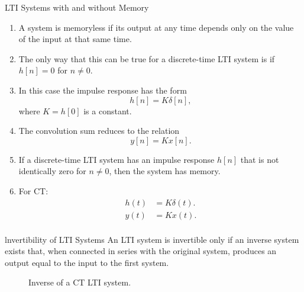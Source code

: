 \begin{frame}{LTI Systems with and without Memory}
    \begin{enumerate}
        \item A system is memoryless if its output at any time depends only on the value of the input at that same time.
        \item The only way that this can be true for a discrete-time LTI system is if $h[n] = 0$ for $n \neq 0$.
        \item In this case the impulse response has the form
        \begin{equation*}
            h[n] = K\delta[n],
        \end{equation*}
        where $K = h[0]$ is a constant.
        \item The convolution sum reduces to the relation
        \begin{equation*}
            y[n] = Kx[n].
        \end{equation*}
        \item If a discrete-time LTI system has an impulse response $h[n]$ that is not identically zero for $n \neq 0$, then the system has memory.
        \item For CT:
            \begin{align*}
                h(t) &= K\delta(t).\\
                y(t) &= Kx(t).\\
            \end{align*}
    \end{enumerate}

\end{frame}





\begin{frame}{lnvertibility of LTI Systems}
    An LTI system is invertible only if an inverse system exists that, when connected in series with the original system, produces an output equal to the input to the first system.


    {
    \begin{figure}
      \centering
      
      \caption{Inverse of a CT LTI system.}\label{fi:lti_inverse}
    \end{figure}
    }
\end{frame}


